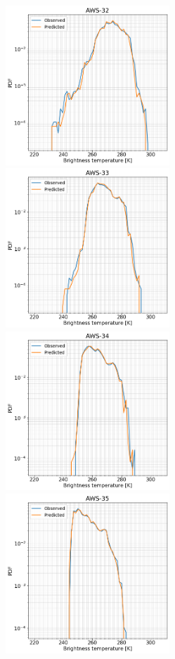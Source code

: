 \documentclass[12pt]{article}
\begin{document}
\begin{figure}[!tb]
	\centering
	\includegraphics[height=60mm]{distribution_predicted_C32}\hspace{5mm}%
	\includegraphics[height=60mm]{distribution_predicted_C33}
	\includegraphics[height=60mm]{distribution_predicted_C34}\hspace{5mm}%
	\includegraphics[height=60mm]{distribution_predicted_C35}

\end{figure}
\end{document}
